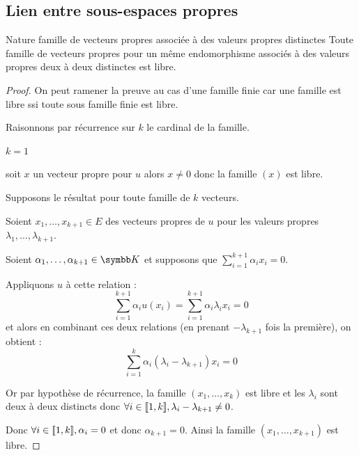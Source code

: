 \subsection{Lien entre sous-espaces propres }

\begin{theorement}{Nature famille de vecteurs propres associée à des valeurs propres distinctes}{}
    Toute famille de vecteurs propres pour un même endomorphisme 
    associés à des valeurs propres deux à deux distinctes est libre. 
\end{theorement}


\begin{proof}
    On peut ramener la preuve au cas d'une famille finie car une famille est libre 
    ssi toute sous famille finie est libre. 

    Raisonnons par récurrence sur $k$ le cardinal de la famille. 

     $k = 1$

    \svspace soit $x$ un vecteur propre pour $u$ alors $x \neq 0$ donc la famille $(x)$ est libre.

     Supposons le résultat pour toute famille de $k$ vecteurs. 

    \svspace Soient $x_1, \ldots, x_{k + 1} \in E$ des vecteurs propres de $u$ pour les 
    valeurs propres $\lambda_1, \ldots, \lambda_{k + 1}$.

    Soient $\alpha_1, \ldots, \alpha_{k + 1} \in \K$ et supposons que 
    $\displaystyle \sum_{i = 1}^{k + 1} \alpha_i x_i = 0$.

    Appliquons $u$ à cette relation :
    \[
        \sum_{i = 1}^{k + 1} \alpha_i u(x_i) = \sum_{i = 1}^{k + 1} \alpha_i \lambda_i x_i = 0
    \]
    et alors en combinant ces deux relations (en prenant $- \lambda_{k+1}$ fois la première), on obtient :
    \[
        \sum_{i = 1}^{k} \alpha_i (\lambda_i - \lambda_{k + 1}) x_i = 0
    \]

    Or par hypothèse de récurrence, la famille $(x_1, \ldots, x_k)$ est libre et 
    les $\lambda_i$ sont deux à deux distincts donc $\forall i \in [\![1, k]\!], \lambda_i - \lambda_{k + 1} \neq 0$.

    Donc $\forall i \in [\![1, k]\!], \alpha_i = 0$ et donc $\alpha_{k + 1} = 0$. 
    Ainsi la famille $(x_1, \ldots, x_{k + 1})$ est libre.
\end{proof}

